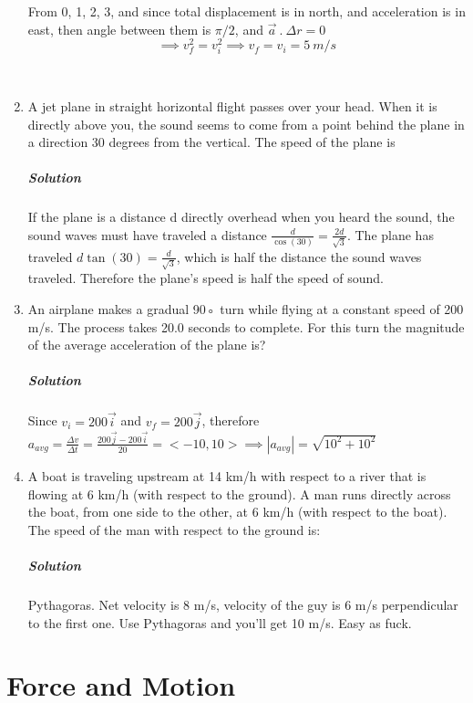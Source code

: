 \documentclass{article}
\begin{document}
\begin{enumerate}[1.]
		From 0, 1, 2, 3, and since total displacement is in north, and acceleration is in east, then angle between them is $ \pi /2 $, and $ \vec{ a }\ .\ \varDelta r = 0 $
		\[
			\implies v_f^2 = v_i^2 \implies v_f = v_i = 5\ m / s
		\]

		\
	
\item  A jet plane in straight horizontal flight passes over your head. When it is directly above you, the sound seems to come from a point behind the plane in a direction 30 degrees from the vertical.
The speed of the plane is
\subparagraph{Solution}
		If the plane is a distance d directly overhead when you heard the sound, the sound waves must have traveled a distance $\frac{d}{\cos(30)} = \frac{2d}{ \sqrt{ 3 } } $.  The plane has traveled $d\tan(30) = \frac{d}{\sqrt{3}}$, which is half the distance the sound waves traveled.  Therefore the plane's speed is half the speed of sound.

\item An airplane makes a gradual 90◦ turn while flying at a constant speed of 200 m/s. The process takes 20.0 seconds to complete. For this turn the magnitude of the average acceleration of the plane is?
	\subparagraph{Solution}
		Since $ v_i=200 \vec{ i } $ and $ v_f = 200 \vec{ j } $, therefore $ a_{avg}= \frac{ \varDelta v }{ \varDelta t } = \frac{ 200 \vec{ j }- 200 \vec{ i } }{ 20 } = <-10,10> \implies |a_{avg}| = \sqrt{ 10^2 + 10^2 } $  

\item A boat is traveling upstream at 14 km/h with respect to a river that is flowing at 6 km/h (with
respect to the ground). A man runs directly across the boat, from one side to the other, at
6 km/h (with respect to the boat). The speed of the man with respect to the ground is:
\subparagraph{Solution}
Pythagoras. Net velocity is  8 m/s, velocity of the guy is 6 m/s perpendicular to the first one. Use Pythagoras and you'll get 10 m/s. Easy as fuck.

\end{enumerate}
\newpage

\section{Force and Motion}
\end{document}
